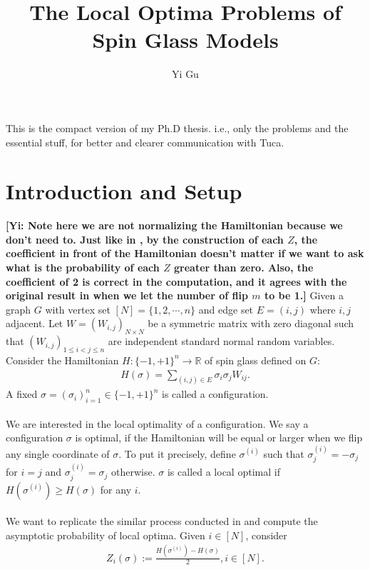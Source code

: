 \documentclass[10pt]{article}
\author{Yi Gu}
\newcommand{\gy}[1]{\textbf{\color{red}[Yi: #1]}}
\newenvironment{Proof of lemma}{\noindent{\bf Proof of Lemma}}{\hfill$\Box$\newline}
\newenvironment{Proof of claim}{\noindent{\bf Proof of claim}}{\hfill$\Box$\newline}
\newenvironment{Proof of theorem}{\noindent{\bf Proof of Theorem}}{\hfill\scriptsize{$\Box$}\newline}
\newenvironment{Proof of theorems}{\noindent{\bf Proof of Theorems}}{\hfill$\Box$\newline}
\newenvironment{Proof of proposition}{\noindent{\bf Proof of Proposition}}{\hfill$\Box$\newline}
\newenvironment{Proof of propositions}{\noindent{\bf Proof of Propositions}}{\hfill$\Box$\newline}
\newenvironment{Proof of exercise}{\noindent{\it Proof of Exercise:}}{\hfill$\Box$}
\numberwithin{equation}{section}
\begin{document}
\title{The Local Optima Problems of Spin Glass Models}
\maketitle


This is the compact version of my Ph.D thesis. i.e., only the problems and the essential stuff, for better and clearer communication with Tuca.
\section{Introduction and Setup}
\gy{Note here we are not normalizing the Hamiltonian because we don't need to. Just like in \cite{SK_optimal}, by the construction of each $Z$, the coefficient in front of the Hamiltonian doesn't matter if we want to ask what is the probability of each $Z$ greater than zero. Also, the coefficient of 2 is correct in the computation, and it agrees with the original result in \cite{SK_optimal} when we let the number of flip $m$ to be 1.}
Given a graph $G$ with vertex set $[N]=\{1,2,\cdots,n\}$ and edge set $E = (i,j)$ where $i,j$ adjacent. Let $W = (W_{i,j})_{N\times N}$ be a symmetric matrix with zero diagonal such that $(W_{i,j})_{1 \leq i < j \leq n}$ are independent standard normal random variables. Consider the Hamiltonian $H:\{-1,+1\}^n \to \mathbb{R}$ of spin glass defined on $G$:
\begin{align}
    H(\sigma) = \sum_{(i,j) \in E} \sigma_i \sigma_j W_{ij}.
\end{align}
A fixed $\sigma = (\sigma_i)^n_{i=1} \in \{-1,+1\}^n$ is called a configuration. \\ \\
We are interested in the local optimality of a configuration. We say a configuration  $\sigma$ is optimal, if the Hamiltonian will be equal or larger when we flip any single coordinate of $\sigma$. To put it precisely, define $\sigma^{(i)}$ such that $\sigma^{(i)}_j = -\sigma_j$ for $i= j$ and $\sigma^{(i)}_j = \sigma_j$ otherwise. $\sigma$ is called a local optimal if $H(\sigma^{(i)}) \geq H(\sigma)$ for any $i$. \\ \\
We want to replicate the similar process conducted in \cite{SK_optimal} and compute the asymptotic probability of local optima. Given $i \in [N]$, consider
\begin{align}
    Z_i(\sigma) := \frac{H(\sigma^{(i)})-H(\sigma)}{2}, i\in [N].
\end{align}
\end{document}
